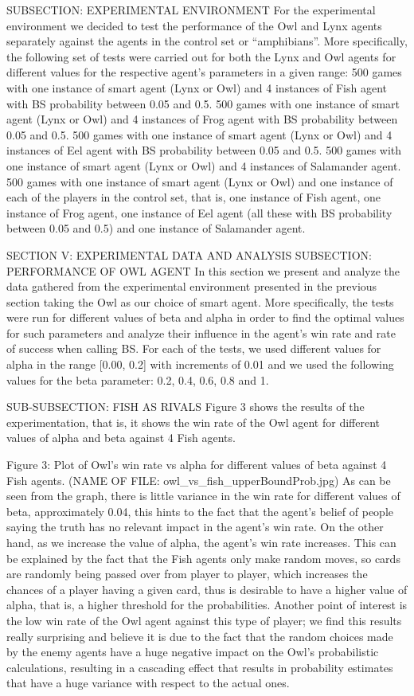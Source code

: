 \documentclass[a4paper,12pt]{article}
\begin{document}
SUBSECTION: EXPERIMENTAL ENVIRONMENT
For the experimental environment we decided to test the performance of the Owl and Lynx agents separately against the agents in the control set or “amphibians”. More specifically, the following set of tests were carried out for both the Lynx and Owl agents for different values for the respective agent’s parameters in a given range:
500 games with one instance of smart agent (Lynx or Owl) and 4 instances of Fish agent with BS probability between 0.05 and 0.5.
500 games with one instance of smart agent (Lynx or Owl) and 4 instances of Frog agent with BS probability between 0.05 and 0.5.
500 games with one instance of smart agent (Lynx or Owl) and 4 instances of Eel agent with BS probability between 0.05 and 0.5.
500 games with one instance of smart agent (Lynx or Owl) and 4 instances of Salamander agent.
500 games with one instance of smart agent (Lynx or Owl) and one instance of each of the players in the control set, that is, one instance of Fish agent, one instance of Frog agent, one instance of Eel agent  (all these with BS probability between 0.05 and 0.5) and one instance of Salamander agent.

SECTION V: EXPERIMENTAL DATA AND ANALYSIS
SUBSECTION: PERFORMANCE OF OWL AGENT
In this section we present and analyze the data gathered from the experimental environment presented in the previous section taking the Owl as our choice of smart agent. More specifically, the tests were run for different values of beta and alpha in order to find the optimal values for such parameters and analyze their influence in the agent’s win rate and rate of success when calling BS. For each of the tests, we used different values for alpha in the range [0.00, 0.2] with increments of 0.01 and we used the following values for the beta parameter: 0.2, 0.4, 0.6, 0.8 and 1.

SUB-SUBSECTION: FISH AS RIVALS
Figure 3 shows the results of the experimentation, that is, it shows the win rate of the Owl agent for different values of alpha and beta against 4 Fish agents.

	Figure 3: Plot of Owl’s win rate vs alpha for different values of beta against 4 Fish agents. (NAME OF FILE: owl_vs_fish_upperBoundProb.jpg)
	As can be seen from the graph, there is little variance in the win rate for different values of beta, approximately 0.04, this hints to the fact that the agent’s belief of people saying the truth has no relevant impact in the agent’s win rate. On the other hand, as we increase the value of alpha, the agent’s win rate increases. This can be explained by the fact that the Fish agents only make random moves, so cards are randomly being passed over from player to player, which increases the chances of a player having a given card, thus is desirable to have a higher value of alpha, that is, a higher threshold for the probabilities. Another point of interest is the low win rate of the Owl agent against this type of player; we find this results really surprising and believe it is due to the fact that the random choices made by the enemy agents have a huge negative impact on the Owl’s probabilistic calculations, resulting in a cascading effect that results in probability estimates that have a huge variance with respect to the actual ones.
\end{document}
